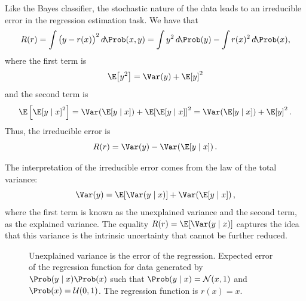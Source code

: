 Like the Bayes classifier, the stochastic nature of the data leads to an irreducible
error in the regression estimation task.  We have that
\begin{equation*}
  R(r) = \int \big(y - r(x)\big)^2\, d\!\Prob(x, y) =
    \int y^2\, d\!\Prob(y) - \int r(x)^2\, d\!\Prob(x)\text{,}
\end{equation*}
where the first term is
\[
  \E\!\left[y^2\right] = \Var(y) + \E\!\left[y\right]^2
\]
and the second term is
\[
  \E\left[\E\!\left[y \mid x\right]^2\right] =
    \Var\!\left(\E\!\left[y \mid x\right]\right) + \E\!\left[\E\!\left[y \mid x\right]\right]^2 =
    \Var\!\left(\E\!\left[y \mid x\right]\right) + \E\!\left[y\right]^2\text{.}
\]
Thus, the irreducible error is
\[
  R(r) = \Var(y) - \Var\!\left(\E\!\left[y \mid x\right]\right) \text{.}
\]

The interpretation of the irreducible error comes from the law of the total variance:
\begin{equation*}
  \Var(y) = \E\!\left[ \Var(y \mid x) \right] + \Var\!\left(\E\!\left[y \mid x\right]\right)\text{,}
\end{equation*}
where the first term is known as the unexplained variance and the second term, as the
explained variance.  The equality $R(r) = \E\!\left[ \Var(y \mid x) \right]$
captures the idea that this variance is the intrinsic uncertainty that cannot be further
reduced.

\begin{figure}
  \centering
  \caption{
  Unexplained variance is the error of the regression.
  Expected error of the regression function for data generated by
  $\Prob(y \mid x) \Prob(x)$ such that $\Prob(y \mid x) = \mathcal{N}(x, 1)$ and
  $\Prob(x) = \mathcal{U}(0, 1)$.  The regression function is $r(x) = x$.
  }
  \label{fig:explained-unexplained-variance}
\end{figure}

